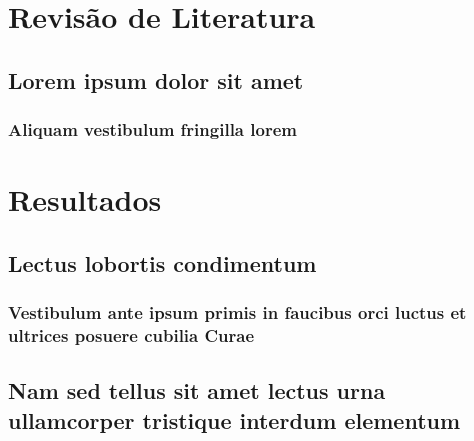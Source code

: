\documentclass[
  12pt,       %
  openright,      %
  twoside,      %
  a4paper,      %
  english,      %
  french,       %
  spanish,      %
  brazil,       %
  ]{abntex2}
\begin{document}



\part{Revisão de Literatura}

\chapter{Lorem ipsum dolor sit amet}

\section{Aliquam vestibulum fringilla lorem}

\lipsum[1]

\lipsum[2-3]

\part{Resultados}

\chapter{Lectus lobortis condimentum}

\section{Vestibulum ante ipsum primis in faucibus orci luctus et ultrices
posuere cubilia Curae}

\lipsum[21-22]

\chapter{Nam sed tellus sit amet lectus urna ullamcorper tristique interdum
elementum}
\end{document}
